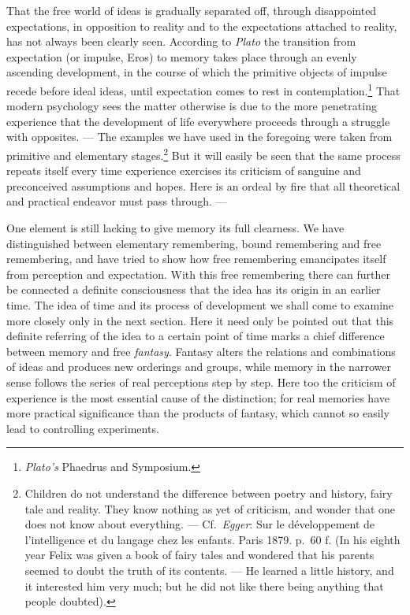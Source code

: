 \documentclass[12pt,a4paper]{book}
\newcommand{\opage}[1]{\marginnote{\footnotesize\textit{[#1]}}}
\begin{document}
That the free world of ideas is gradually separated off, through
disappointed expectations, in opposition to reality and to the
expectations attached to reality, has not always been clearly seen.
According to \emph{Plato} the transition from expectation (or impulse,
Eros) to memory takes place through an evenly ascending development, in
the course of which the primitive objects of impulse recede before ideal
ideas, until expectation comes to rest in
contemplation.\footnote{\emph{Plato's} Phaedrus and Symposium.} That
modern psychology sees the matter otherwise is due to the more penetrating
experience that the development of life everywhere proceeds through a
struggle with opposites. --- The examples we have used in the foregoing
were taken from primitive and elementary stages.\footnote{Children do not
understand the difference between poetry and history, fairy tale and
reality. They know nothing as yet of criticism, and wonder that one does
not know about everything. --- Cf.\ \emph{Egger}: Sur le développement de
l'intelligence et du langage chez les enfants. Paris 1879. p.~60 f. (In
his eighth year Felix was given a book of fairy tales and wondered that
his parents seemed to doubt the truth of its contents. --- He learned a
little history, and it interested him very much; but he did not like there
being anything that people doubted).} But it will easily be seen that the
same
\opage{165}process repeats itself every time experience exercises its
criticism of sanguine and preconceived assumptions and hopes. Here is an
ordeal by fire that all theoretical and practical endeavor must pass
through. ---

One element is still lacking to give memory its full clearness. We have
distinguished between elementary remembering, bound remembering and free
remembering, and have tried to show how free remembering emancipates
itself from perception and expectation. With this free remembering there
can further be connected a definite consciousness that the idea has its
origin in an earlier time. The idea of time and its process of
development we shall come to examine more closely only in the next
section. Here it need only be pointed out that this definite referring of
the idea to a certain point of time marks a chief difference between
memory and free \emph{fantasy}. Fantasy alters the relations and
combinations of ideas and produces new orderings and groups, while memory
in the narrower sense follows the series of real perceptions step by step.
Here too the criticism of experience is the most essential cause of the
distinction; for real memories have more practical significance than the
products of fantasy, which cannot so easily lead to controlling
experiments.
\end{document}
